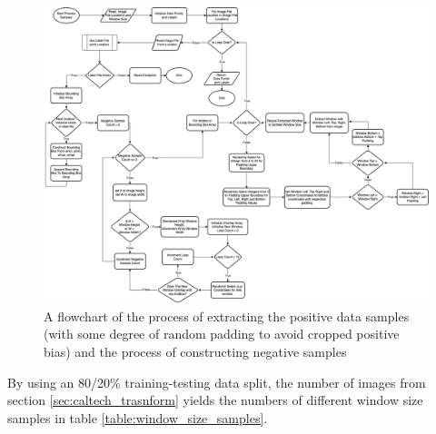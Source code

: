 \begin{figure}
    \centering
    \includegraphics[width=\linewidth]{images/ee_dataset_low.drawio (1).png}
    \caption{A flowchart of the process of extracting the positive data samples (with some degree of random padding to avoid cropped positive bias) and the process of constructing negative samples }
    \label{fig:dataset_low}
\end{figure}

By using an 80/20\% training-testing data split, the number of images from section \ref{sec:caltech_trasnform} yields the numbers of different window size samples in table \ref{table:window_size_samples}.

